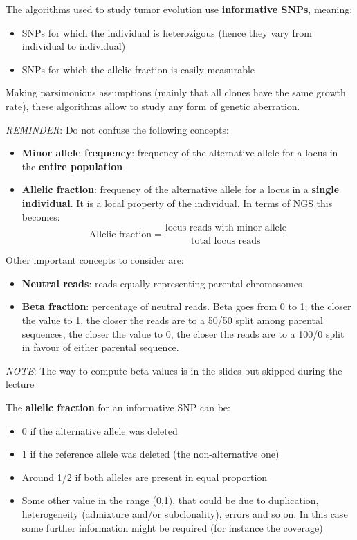   The algorithms used to study tumor evolution use \textbf{informative SNPs}, meaning:
  \begin{itemize}
    \item SNPs for which the individual is heterozigous (hence they vary from individual to individual)
    \item SNPs for which the allelic fraction is easily measurable 
  \end{itemize}
  Making parsimonious assumptions (mainly that all clones have the same growth rate), these algorithms allow to study any form of genetic aberration. 

  \textit{REMINDER}: Do not confuse the following concepts:
  \begin{itemize}
    \item \textbf{Minor allele frequency}: frequency of the alternative allele for a locus in the \textbf{entire population}
    \item \textbf{Allelic fraction}: frequency of the alternative allele for a locus in a \textbf{single individual}. It is a local property of the individual. In terms of NGS this becomes:
    $$
    \text{Allelic fraction} = \frac{\text{locus reads with minor allele}}{\text{total locus reads}} 
    $$
  \end{itemize} 

  Other important concepts to consider are:
  \begin{itemize}
    \item \textbf{Neutral reads}: reads equally representing parental chromosomes 
    \item \textbf{Beta fraction}: percentage of neutral reads. Beta goes from 0 to 1; the closer the value to 1, the closer the reads are to a 50/50 split among parental sequences, the closer the value to 0, the closer the reads are to a 100/0 split in favour of either parental sequence. 
  \end{itemize}
  
  \textit{NOTE}: The way to compute beta values is in the slides but skipped during the lecture 
  
  The \textbf{allelic fraction} for an informative SNP can be:
  \begin{itemize}
    \item 0 if the alternative allele was deleted
    \item 1 if the reference allele was deleted (the non-alternative one)
    \item Around 1/2 if both alleles are present in equal proportion
    \item Some other value in the range (0,1), that could be due to duplication, heterogeneity (admixture and/or subclonality), errors and so on. In this case some further information might be required (for instance the coverage)
  \end{itemize}

